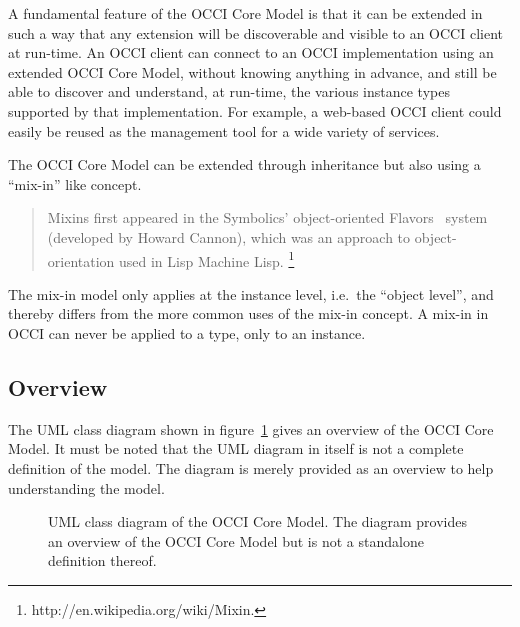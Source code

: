 \documentclass[10pt,a4paper]{article}
\begin{document}
A fundamental feature of the OCCI Core Model is that it can be
extended in such a way that any extension will be discoverable and
visible to an OCCI client at run-time. An OCCI client can connect to
an OCCI implementation using an extended OCCI Core Model, without
knowing anything in advance, and still be able to discover and
understand, at run-time, the various instance types
supported by that implementation.
For example, a
web-based OCCI client could easily be reused as the management tool
for a wide variety of services.

The OCCI Core Model can be extended through inheritance but also
using a ``mix-in'' like concept.

\begin{quote}
  Mixins first appeared in the Symbolics' object-oriented
  Flavors~\cite{Moon:1986:flavors} system (developed by Howard
  Cannon), which was an approach to object-orientation used in Lisp
  Machine Lisp.%
  \footnote{http://en.wikipedia.org/wiki/Mixin.}
\end{quote}

The mix-in model only applies at the instance level, i.e.~the ``object
level'', and thereby differs from the more common uses of the mix-in
concept. A mix-in in OCCI can never be applied to a type, only to an
instance.

\subsection{Overview}

The UML class diagram shown in figure~\ref{fig:occi_model} gives an
overview of the OCCI Core Model. It must be noted that the UML diagram
in itself is not a complete definition of the model. The diagram is
merely provided as an overview to help understanding the model.

\begin{figure}[!h]
  {\centering {} \par}
  \caption{UML class diagram of the OCCI Core Model. The diagram
    provides an overview of the OCCI Core Model but is not a
    standalone definition thereof.}
  \label{fig:occi_model}
\end{figure}
\end{document}
